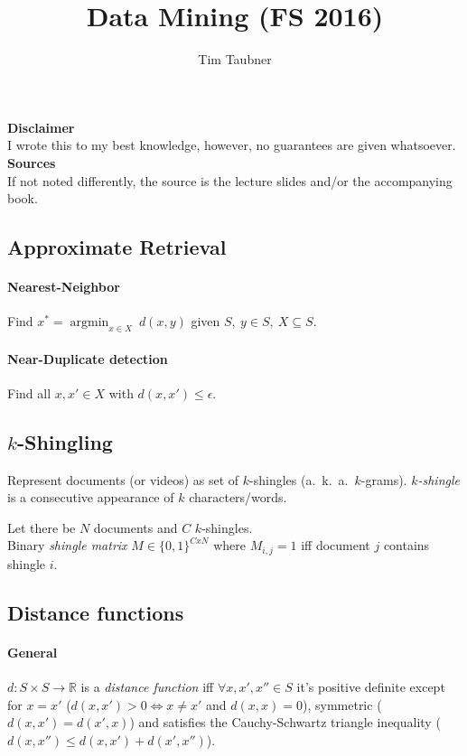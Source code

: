 \documentclass[a4paper, 9pt, DIV=24]{scrartcl}
\title{Data Mining (FS 2016)}
\author{Tim Taubner}
\DeclareMathOperator{\argmin}{argmin}
\newcommand{\R}{\mathbb{R}}
\begin{document}
\pagestyle{fancy}
\fancyhf{}
\fancyhead[L]{\title}

\begin{centering}
\vspace*{1em}
\vfill
\textbf{Disclaimer} \\
I wrote this to my best knowledge, however, no guarantees are given whatsoever.
\vfill
\textbf{Sources} \\
If not noted differently, the source is the lecture slides and/or the accompanying book.
\vfill
\end{centering}

\setcounter{page}{0}

\clearpage

\begin{twocolumn}

\section{Approximate Retrieval}
\paragraph{Nearest-Neighbor} Find $x^* = \argmin_{x \in X} \ d(x,y)$
given $S,\ y \in S,\ X\subseteq S$.
\paragraph{Near-Duplicate detection}
Find all $x, x'\in X$ with $d(x,x') \leq \epsilon$.
\subsection{$k$-Shingling}
Represent documents (or videos) as set of $k$-shingles (a.\ k.\ a.\ $k$-grams).
\emph{$k$-shingle} is a consecutive appearance of $k$ characters/words.

Let there be $N$ documents and $C$ $k$-shingles. \\
Binary \emph{shingle matrix} $M \in \{0,1\}^{CxN}$ where $M_{i,j} = 1$ iff document $j$ contains shingle $i$.
\subsection{Distance functions}
\paragraph{General}
$d: S \times S \rightarrow \R$ is a \emph{distance function} iff $\forall x,x',x''\in S$ it's positive definite except for $x=x'$ ($d(x,x') > 0 \iff x \neq x'$ and $d(x,x) = 0$), symmetric ($d(x,x') = d(x',x)$) and satisfies the Cauchy-Schwartz triangle inequality ($d(x,x'') \leq d(x,x') + d(x',x'')$).

\end{twocolumn}
\end{document}

